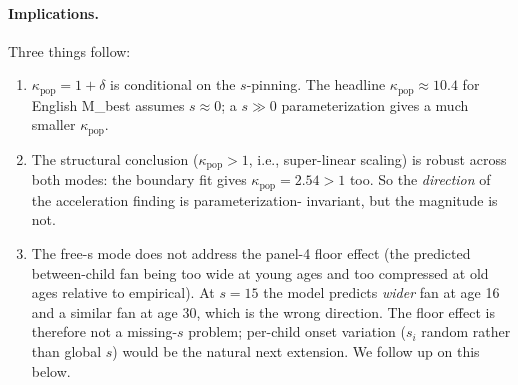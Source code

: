 \documentclass[11pt]{article}
\begin{document}
\paragraph{Implications.}
Three things follow:
\begin{enumerate}[leftmargin=1.3em]
\item \(\kappa_{\text{pop}} = 1 + \delta\) is conditional on the
  \(s\)-pinning. The headline \(\kappa_{\text{pop}} \approx 10.4\)
  for English M\_best assumes \(s \approx 0\); a \(s \gg 0\)
  parameterization gives a much smaller \(\kappa_{\text{pop}}\).
\item The structural conclusion (\(\kappa_{\text{pop}} > 1\), i.e.,
  super-linear scaling) is robust across both modes: the boundary
  fit gives \(\kappa_{\text{pop}} = 2.54 > 1\) too. So the
  \emph{direction} of the acceleration finding is parameterization-
  invariant, but the magnitude is not.
\item The free-s mode does not address the panel-4 floor effect
  (the predicted between-child fan being too wide at young ages and
  too compressed at old ages relative to empirical). At \(s = 15\)
  the model predicts \emph{wider} fan at age 16 and a similar fan at
  age 30, which is the wrong direction. The floor effect is therefore
  not a missing-\(s\) problem; per-child onset variation
  (\(s_i\) random rather than global \(s\)) would be the natural next
  extension. We follow up on this below.
\end{enumerate}
\end{document}
